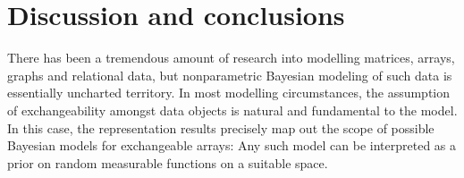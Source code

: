 

\section{Discussion and conclusions}






There has been a tremendous amount of research into modelling matrices, arrays, graphs and relational data, but nonparametric
Bayesian modeling of such data is essentially uncharted territory. 
In most modelling circumstances, the assumption of exchangeability amongst data objects is natural and fundamental to the model.
In this case, the representation results 
\citep{Aldous:1981,Hoover:1979,Kallenberg:1992} 
precisely map out the scope of possible Bayesian models for exchangeable arrays:
Any such model can be interpreted as a prior on random measurable functions on a suitable space.


